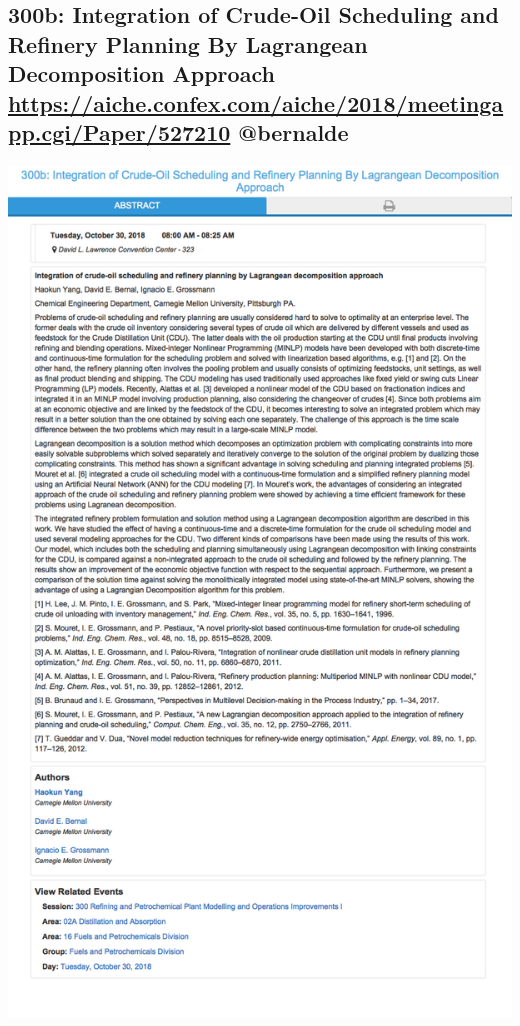 \documentclass[11pt]{article}
\begin{document}
\subsection{300b: Integration of Crude-Oil Scheduling and Refinery Planning By Lagrangean Decomposition Approach \url{https://aiche.confex.com/aiche/2018/meetingapp.cgi/Paper/527210} @bernalde}
\label{sec:org127f992}
\begin{center}
\includegraphics[width=.9\linewidth]{./527210.png}
\end{center}
\end{document}
